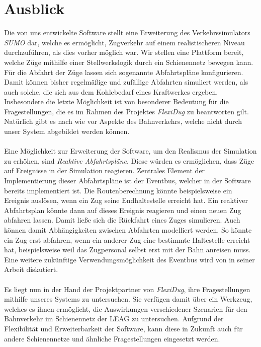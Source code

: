 \section{Ausblick}

Die von uns entwickelte Software stellt eine Erweiterung des Verkehrssimulators \emph{SUMO} dar, welche es ermöglicht, Zugverkehr auf einem realistischeren Niveau durchzuführen, als dies vorher möglich war. Wir stellen eine Plattform bereit, welche Züge mithilfe einer Stellwerkslogik durch ein Schienennetz bewegen kann. Für die Abfahrt der Züge lassen sich sogenannte Abfahrtspläne konfigurieren. Damit können bisher regelmäßige und zufällige Abfahrten simuliert werden, als auch solche, die sich aus dem Kohlebedarf eines Kraftwerkes ergeben. Insbesondere die letzte Möglichkeit ist von besonderer Bedeutung für die Fragestellungen, die es im Rahmen des Projektes \emph{FlexiDug} zu beantworten gilt. Natürlich gibt es nach wie vor Aspekte des Bahnverkehrs, welche nicht durch unser System abgebildet werden können.\\
\\
Eine Möglichkeit zur Erweiterung der Software, um den Realismus der Simulation zu erhöhen, sind \emph{Reaktive Abfahrtspläne}. Diese würden es ermöglichen, dass Züge auf Ereignisse in der Simulation reagieren. Zentrales Element der Implementierung dieser Abfahrtspläne ist der Eventbus, welcher in der Software bereits implementiert ist. Die Routenberechnung könnte beispielsweise ein Ereignis auslösen, wenn ein Zug seine Endhaltestelle erreicht hat. Ein reaktiver Abfahrtsplan könnte dann auf dieses Ereignis reagieren und einen neuen Zug abfahren lassen. Damit ließe sich die Rückfahrt eines Zuges simulieren. Auch können damit Abhängigkeiten zwischen Abfahrten modelliert werden. So könnte ein Zug erst abfahren, wenn ein anderer Zug eine bestimmte Haltestelle erreicht hat, beispielsweise weil das Zugpersonal selbst erst mit der Bahn anreisen muss. Eine weitere zukünftige Verwendungsmöglichkeit des Eventbus wird von \citeauthor{persitzky_fehlerinjektion_2023} in seiner Arbeit \cite{persitzky_fehlerinjektion_2023} diskutiert.\\
\\
Es liegt nun in der Hand der Projektpartner von \emph{FlexiDug}, ihre Fragestellungen mithilfe unseres Systems zu untersuchen. Sie verfügen damit über ein Werkzeug, welches es ihnen ermöglicht, die Auswirkungen verschiedener Szenarien für den Bahnverkehr im Schienennetz der LEAG zu untersuchen. Aufgrund der Flexibilität und Erweiterbarkeit der Software, kann diese in Zukunft auch für andere Schienennetze und ähnliche Fragestellungen eingesetzt werden.
